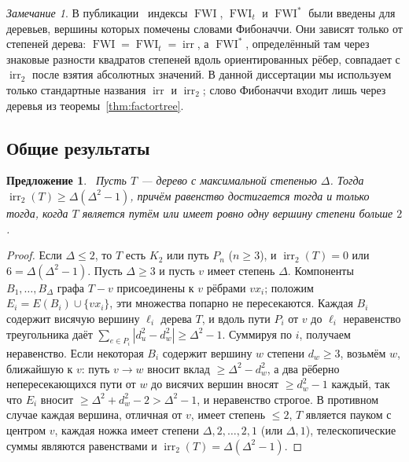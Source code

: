 \documentclass[a4paper,14pt]{extreport}
\theoremstyle{plain}
\newtheorem{proposition}[theorem]{Предложение}
\theoremstyle{definition}
\theoremstyle{remark}
\newtheorem{remark}{Замечание}
\begin{document}
\begin{remark}
	В публикации~\cite{HamoudAbdullahCheb} индексы $\operatorname{FWI}$, $\operatorname{FWI}_t$ и $\operatorname{FWI}^*$ были введены для деревьев, вершины которых помечены словами Фибоначчи.
	Они зависят только от степеней дерева: $\operatorname{FWI}=\operatorname{FWI}_t=\operatorname{irr}$, а $\operatorname{FWI}^*$, определённый там через знаковые разности квадратов степеней вдоль ориентированных рёбер, совпадает с $\operatorname{irr}_2$ после взятия абсолютных значений.
	В данной диссертации мы используем только стандартные названия $\operatorname{irr}$ и $\operatorname{irr}_2$; слово Фибоначчи входит лишь через деревья из теоремы~\ref{thm:factortree}.
\end{remark}
\subsection{Общие результаты}

\begin{proposition}~\label{pron1}
	Пусть $T$ --- дерево с максимальной степенью $\Delta$. Тогда $\operatorname{irr}_2(T)\ge\Delta(\Delta^2-1)$, причём равенство достигается тогда и только тогда, когда $T$ является путём или имеет ровно одну вершину степени больше $2$.
\end{proposition}

\begin{proof}
	Если $\Delta\le2$, то $T$ есть $K_2$ или путь $P_n$ ($n\ge3$), и $\operatorname{irr}_2(T)=0$ или $6=\Delta(\Delta^2-1)$. Пусть $\Delta\ge3$ и пусть $v$ имеет степень $\Delta$.
	Компоненты $B_1,\dots,B_\Delta$ графа $T-v$ присоединены к $v$ рёбрами $vx_i$; положим $E_i=E(B_i)\cup\{vx_i\}$, эти множества попарно не пересекаются.
	Каждая $B_i$ содержит висячую вершину $\ell_i$ дерева $T$, и вдоль пути $P_i$ от $v$ до $\ell_i$ неравенство треугольника даёт
	$\sum_{e\in P_i}|d_u^2-d_w^2|\ge\Delta^2-1$. Суммируя по $i$, получаем неравенство.
	Если некоторая $B_i$ содержит вершину $w$ степени $d_w\ge3$, возьмём $w$, ближайшую к $v$: путь $v\to w$ вносит вклад $\ge\Delta^2-d_w^2$, а два рёберно непересекающихся пути от $w$ до висячих вершин вносят $\ge d_w^2-1$ каждый,
	так что $E_i$ вносит $\ge\Delta^2+d_w^2-2>\Delta^2-1$, и неравенство строгое. В противном случае каждая вершина, отличная от $v$, имеет степень $\le2$, $T$ является пауком с центром $v$,
	каждая ножка имеет степени $\Delta,2,\dots,2,1$ (или $\Delta,1$), телескопические суммы являются равенствами и $\operatorname{irr}_2(T)=\Delta(\Delta^2-1)$.
\end{proof}
\end{document}
